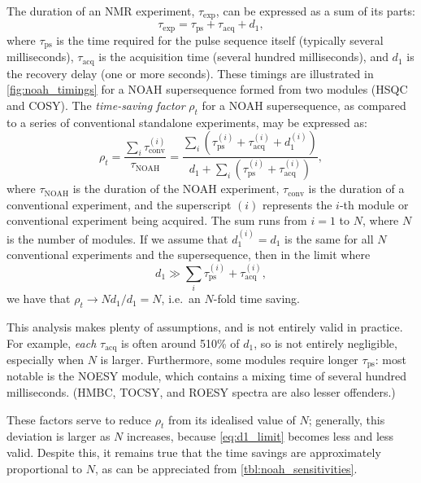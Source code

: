 The duration of an NMR experiment, $\tau_\text{exp}$, can be expressed as a sum of its parts:
\begin{equation}
    \label{eq:exp_duration_2d}
    \tau_\text{exp} = \tau_\text{ps} + \tau_\text{acq} + d_1,
\end{equation}
where $\tau_\text{ps}$ is the time required for the pulse sequence itself (typically several milliseconds), $\tau_\text{acq}$ is the acquisition time (several hundred milliseconds), and $d_1$ is the recovery delay (one or more seconds).
These timings are illustrated in \cref{fig:noah_timings} for a NOAH supersequence formed from two modules (HSQC and COSY).
The \textit{time-saving factor} $\rho_t$ for a NOAH supersequence, as compared to a series of conventional standalone experiments, may be expressed as:
\begin{equation}
    \label{eq:rho_t}
    \rho_t
    = \frac{\sum_i \tau_\text{conv}^{(i)}}{\tau_\text{NOAH}}
    = \frac{{\sum_i (\tau_\text{ps}^{(i)} + \tau_\text{acq}^{(i)} + d_1^{(i)})}}{d_1 + \sum_i (\tau_\text{ps}^{(i)} + \tau_\text{acq}^{(i)})},
\end{equation}
where $\tau_\text{NOAH}$ is the duration of the NOAH experiment, $\tau_\text{conv}$ is the duration of a conventional experiment, and the superscript $(i)$ represents the $i$-th module or conventional experiment being acquired.
The sum runs from $i = 1$ to $N$, where $N$ is the number of modules.
If we assume that $d_1^{(i)} = d_1$ is the same for all $N$ conventional experiments and the supersequence, then in the limit where
\begin{equation}
    \label{eq:d1_limit}
    d_1 \gg \sum_i \tau_\text{ps}^{(i)} + \tau_\text{acq}^{(i)},
\end{equation}
we have that $\rho_t \to Nd_1/d_1 = N$, i.e.\ an $N$-fold time saving.

This analysis makes plenty of assumptions, and is not entirely valid in practice.
For example, \textit{each} $\tau_\text{acq}$ is often around 5\text{--}10\% of $d_1$, so is not entirely negligible, especially when $N$ is larger.
Furthermore, some modules require longer $\tau_\text{ps}$: most notable is the NOESY module, which contains a mixing time of several hundred milliseconds. (HMBC, TOCSY, and ROESY spectra are also lesser offenders.)

These factors serve to reduce $\rho_t$ from its idealised value of $N$; generally, this deviation is larger as $N$ increases, because \cref{eq:d1_limit} becomes less and less valid.
Despite this, it remains true that the time savings are approximately proportional to $N$, as can be appreciated from \cref{tbl:noah_sensitivities}.

